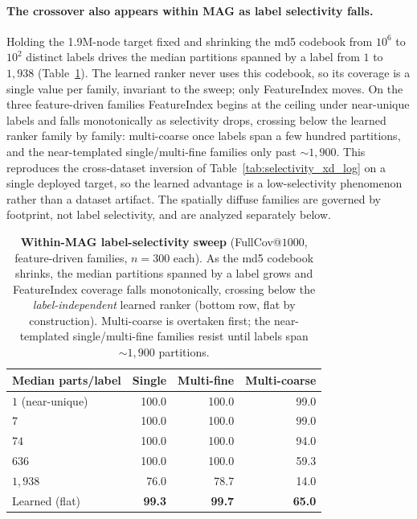 \documentclass{article}
\begin{document}
\paragraph{The crossover also appears within MAG as label selectivity falls.} Holding the 1.9M-node target fixed and shrinking the md5 codebook from $10^6$ to $10^2$ distinct labels drives the median partitions spanned by a label from $1$ to $1{,}938$ (Table~\ref{tab:mag_selectivity_sweep}). The learned ranker never uses this codebook, so its coverage is a single value per family, invariant to the sweep; only FeatureIndex moves. On the three feature-driven families FeatureIndex begins at the ceiling under near-unique labels and falls monotonically as selectivity drops, crossing below the learned ranker family by family: multi-coarse once labels span a few hundred partitions, and the near-templated single/multi-fine families only past ${\sim}1{,}900$. This reproduces the cross-dataset inversion of Table~\ref{tab:selectivity_xd_log} on a single deployed target, so the learned advantage is a low-selectivity phenomenon rather than a dataset artifact. The spatially diffuse families are governed by footprint, not label selectivity, and are analyzed separately below.

\begin{table}[H]
\centering
\caption{\textbf{Within-MAG label-selectivity sweep} (FullCov@$1000$, feature-driven families, $n{=}300$ each). As the md5 codebook shrinks, the median partitions spanned by a label grows and FeatureIndex coverage falls monotonically, crossing below the \emph{label-independent} learned ranker (bottom row, flat by construction). Multi-coarse is overtaken first; the near-templated single/multi-fine families resist until labels span ${\sim}1{,}900$ partitions.}
\label{tab:mag_selectivity_sweep}
\small
\setlength{\tabcolsep}{6pt}
\begin{tabular}{lrrr}
\toprule
Median parts/label & Single & Multi-fine & Multi-coarse \\
\midrule
$1$ (near-unique)   & 100.0 & 100.0 & 99.0 \\
$7$                 & 100.0 & 100.0 & 99.0 \\
$74$                & 100.0 & 100.0 & 94.0 \\
$636$               & 100.0 & 100.0 & 59.3 \\
$1{,}938$           & 76.0  & 78.7  & 14.0 \\
\midrule
Learned (flat)      & \textbf{99.3} & \textbf{99.7} & \textbf{65.0} \\
\bottomrule
\end{tabular}
\end{table}
\end{document}
